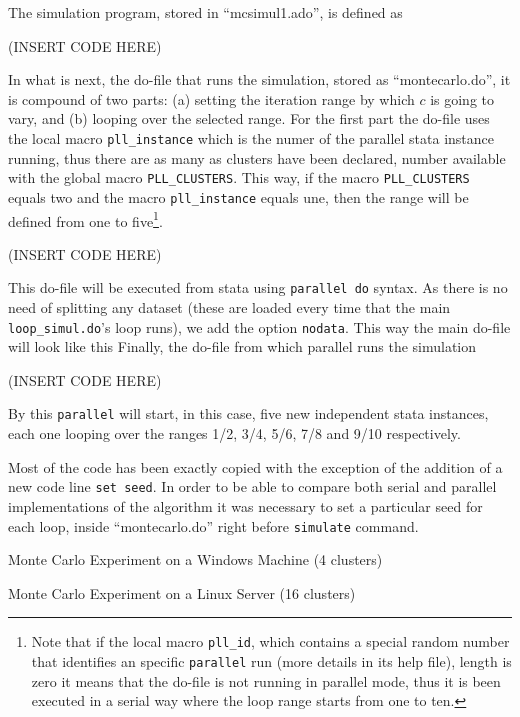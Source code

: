 \documentclass[bib]{statapress}
\begin{document}
The simulation program, stored in ``mcsimul1.ado'', is defined as

(INSERT CODE HERE)

In what is next, the do-file that runs the simulation, stored as ``montecarlo.do'', it is compound of two parts: (a) setting the iteration range by which $c$ is going to vary, and (b) looping over the selected range. For the first part the do-file uses the local macro {\tt pll\_instance} which is the numer of the parallel stata instance running, thus there are as many as clusters have been declared, number available with the global macro {\tt PLL\_CLUSTERS}. This way, if the macro {\tt PLL\_CLUSTERS} equals two and the macro {\tt pll\_instance} equals une, then the range will be defined from one to five\footnote{Note that if the local macro {\tt pll\_id}, which contains a special random number that identifies an specific {\tt parallel} run (more details in its help file), length is zero it means that the do-file is not running in parallel mode, thus it is been executed in a serial way where the loop range starts from one to ten.}.
\bigskip

(INSERT CODE HERE)

\noindent This do-file will be executed from stata using {\tt parallel do} syntax. As there is no need of splitting any dataset (these are loaded every time that the main {\tt loop\_simul.do}'s loop runs), we add the option {\tt nodata}. This way the main do-file will look like this
Finally, the do-file from which parallel runs the simulation

(INSERT CODE HERE)

By this {\tt parallel} will start, in this case, five new independent stata instances, each one looping over the ranges 1/2, 3/4, 5/6, 7/8 and 9/10 respectively.

Most of the code has been exactly copied with the exception of the addition of a new code line {\tt set seed}. In order to be able to compare both serial and parallel implementations of the algorithm it was necessary to set a particular seed for each loop, inside ``montecarlo.do'' right before {\tt simulate} command.

\begin{table}[!h]
\centering
\caption{Monte Carlo Experiment on a Windows Machine (4 clusters)}

\end{table}

\begin{table}[!h]
\centering
\caption{Monte Carlo Experiment on a Linux Server (16 clusters)}

\end{table}




\end{document}
